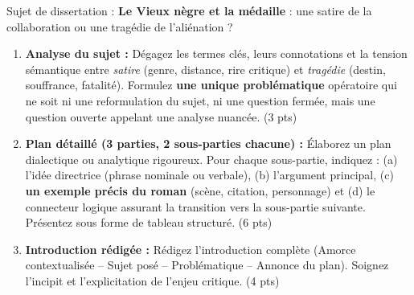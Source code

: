 \documentclass[11pt]{article}
\begin{document}
\begin{exercice}
Sujet de dissertation : \og \textbf{Le Vieux nègre et la médaille} : une satire de la collaboration ou une tragédie de l'aliénation ? \fg

\begin{enumerate}
    \item \textbf{Analyse du sujet :} Dégagez les termes clés, leurs connotations et la tension sémantique entre \textit{satire} (genre, distance, rire critique) et \textit{tragédie} (destin, souffrance, fatalité). Formulez \textbf{une unique problématique} opératoire qui ne soit ni une reformulation du sujet, ni une question fermée, mais une question ouverte appelant une analyse nuancée. (3 pts)
    \item \textbf{Plan détaillé (3 parties, 2 sous-parties chacune) :} Élaborez un plan dialectique ou analytique rigoureux. Pour chaque sous-partie, indiquez : (a) l'idée directrice (phrase nominale ou verbale), (b) l'argument principal, (c) \textbf{un exemple précis du roman} (scène, citation, personnage) et (d) le connecteur logique assurant la transition vers la sous-partie suivante. Présentez sous forme de tableau structuré. (6 pts)
    \item \textbf{Introduction rédigée :} Rédigez l'introduction complète (Amorce contextualisée -- Sujet posé -- Problématique -- Annonce du plan). Soignez l'incipit et l'explicitation de l'enjeu critique. (4 pts)
\end{enumerate}
\end{exercice}
\end{document}

